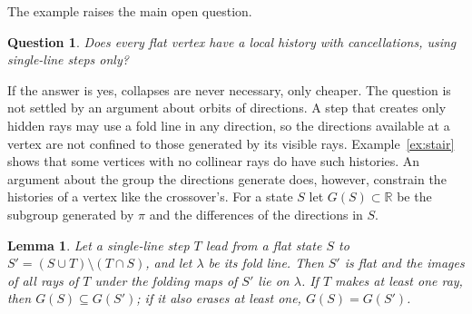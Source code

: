 \documentclass[11pt]{article}
\newtheorem{lemma}[theorem]{Lemma}
\newtheorem{question}[theorem]{Question}
\theoremstyle{definition}
\theoremstyle{remark}
\newcommand{\R}{\mathbb{R}}
\begin{document}
The example raises the main open question.

\begin{question}\label{q:collapse}
Does every flat vertex have a local history with cancellations, using single-line steps only?
\end{question}

If the answer is yes, collapses are never necessary, only cheaper. The question is not settled by an argument about orbits of directions. A step that creates only hidden rays may use a fold line in any direction, so the directions available at a vertex are not confined to those generated by its visible rays. Example~\ref{ex:stair} shows that some vertices with no collinear rays do have such histories.
An argument about the group the directions generate does, however, constrain the histories of a vertex like the crossover's. For a state $S$ let $G(S)\subset\R$ be the subgroup generated by $\pi$ and the differences of the directions in $S$.

\begin{lemma}\label{lem:group}
Let a single-line step $T$ lead from a flat state $S$ to $S'=(S\cup T)\setminus(T\cap S)$, and let $\lambda$ be its fold line. Then $S'$ is flat and the images of all rays of $T$ under the folding maps of $S'$ lie on $\lambda$. If $T$ makes at least one ray, then $G(S)\subseteq G(S')$; if it also erases at least one, $G(S)=G(S')$.
\end{lemma}
\end{document}
